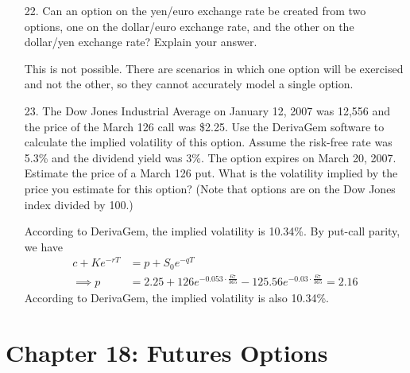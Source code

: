 \documentclass{article}
\begin{document}
\begin{itemize}
\begin{enumerate}[(a)]
		\end{enumerate}

	\item[22.] Can an option on the yen/euro exchange rate be created from two options, one on the dollar/euro exchange rate, and the other on the dollar/yen exchange rate? Explain your answer.
		\begin{soln}
			This is not possible. There are scenarios in which one option will be exercised and not the other, so they cannot accurately model a single option.
		\end{soln}

	\item[23.] The Dow Jones Industrial Average on January 12, 2007 was 12,556 and the price of the March 126 call was \$2.25. Use the DerivaGem software to calculate the implied volatility of this option. Assume the risk-free rate was 5.3\% and the dividend yield was 3\%. The option expires on March 20, 2007. Estimate the price of a March 126 put. What is the volatility implied by the price you estimate for this option? (Note that options are on the Dow Jones index divided by 100.)
		\begin{soln}
			According to DerivaGem, the implied volatility is 10.34\%. By put-call parity, we have
			\begin{align*}
				c + Ke^{-rT} &= p + S_0e^{-qT} \\
				\implies p &= 2.25 + 126e^{-0.053\cdot \frac{67}{365}} - 125.56e^{-0.03\cdot \frac{67}{365}} = 2.16
			\end{align*}
			According to DerivaGem, the implied volatility is also 10.34\%.
		\end{soln}
		
\end{itemize}

\section*{Chapter 18: Futures Options}
\end{document}
